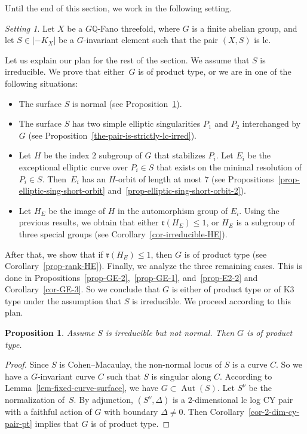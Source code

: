 \documentclass[11pt]{amsart}
\numberwithin{equation}{section}
\newtheorem{proposition}[thm]{Proposition}
\theoremstyle{definition}
\theoremstyle{remark}
\newtheorem{setting}[thm]{Setting} %
\DeclareMathOperator{\Aut}{Aut}
\begin{document}
Until the end of this section, we work in the following setting. 

\begin{setting}
Let $X$ be a $G\mathbb{Q}$-Fano threefold, where $G$ is a finite abelian group, and let $S\in|-K_X|$ be a $G$-invariant element such that the pair $(X, S)$ is lc.
\end{setting}

Let us explain our plan for the rest of the section. 
We assume that $S$ is irreducible. 
We prove that either~$G$ is of product type, or we are in one of the following situations:  
\begin{itemize}
\item
The surface $S$ is normal (see Proposition~\ref{prop-non-normal-irreducible-surface}).
\item
The surface $S$ has two simple elliptic singularities $P_1$ and $P_2$ interchanged by $G$ (see Proposition~\ref{the-pair-is-strictly-lc-irred}).
\item
Let $H$ be the index $2$ subgroup of $G$ that stabilizes $P_i$. Let $E_i$ be the exceptional elliptic curve over $P_i\in S$ that exists on the minimal resolution of $P_i\in S$. Then~$E_i$ has an $H$-orbit of length at most $7$ (see Propositions~\ref{prop-elliptic-sing-short-orbit} and~\ref{prop-elliptic-sing-short-orbit-2}).
\item
Let $H_E$ be the image of $H$ in the automorphism group of $E_i$. Using the previous results, we obtain that either $\mathfrak{r}(H_E)\leq 1$, or $H_E$ is a subgroup of three special groups (see Corollary~\ref{cor-irreducible-HE}).
\end{itemize}
After that, we show that if $\mathfrak{r}(H_E)\leq 1$, then $G$ is of product type (see Corollary~\ref{prop-rank-HE}). 
Finally, we analyze the three remaining cases. This is done in Propositions~\ref{prop-GE-2},~\ref{prop-GE-1}, and~\ref{prop-E2-2} and Corollary~\ref{cor-GE-3}. So we conclude that $G$ is either of product type or of K3 type under the assumption that $S$ is irreducible. We proceed according to this plan.

\begin{proposition}
\label{prop-non-normal-irreducible-surface}
Assume $S$ is irreducible but not normal. Then $G$ is of product type.  
\end{proposition}

\begin{proof}
Since $S$ is Cohen--Macaulay, the non-normal locus of $S$ is a curve $C$. So we have a $G$-invariant curve $C$ such that $S$ is singular along $C$.  According to Lemma~\ref{lem-fixed-curve-surface}, we have $G\subset \Aut(S)$.  Let $S^\nu$ be the normalization of~$S$. By adjunction, $(S^\nu, \Delta)$ is a $2$-dimensional lc log CY pair with a faithful action of $G$ with boundary $\Delta\neq 0$. Then Corollary~\ref{cor-2-dim-cy-pair-pt} implies that $G$ is of product type.
\end{proof}
\end{document}
